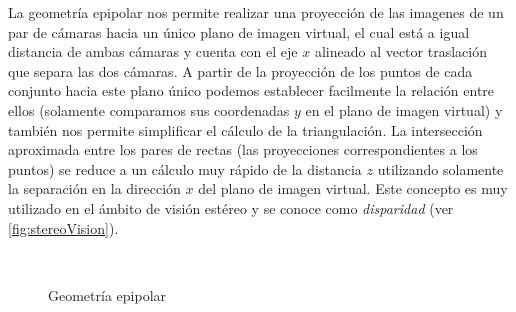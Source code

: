 La geometría epipolar nos permite realizar una proyección de las imagenes de un par de cámaras hacia un único plano de imagen virtual, el cual está a igual distancia de ambas cámaras y cuenta con el eje $x$ alineado al vector traslación que separa las dos cámaras. 
A partir de la proyección de los puntos de cada conjunto hacia este plano único podemos establecer facilmente la relación entre ellos (solamente comparamos sus coordenadas $y$ en el plano de imagen virtual) y también nos permite simplificar el cálculo de la triangulación. La intersección aproximada entre los pares de rectas (las proyecciones correspondientes a los puntos) se reduce a un cálculo muy rápido de la distancia $z$ utilizando solamente la separación en la dirección $x$ del plano de imagen virtual. Este concepto es muy utilizado en el ámbito de visión estéreo y se conoce como \emph{disparidad} (ver \autoref{fig:stereoVision}).

\begin{figure}[!bth]
    \myfloatalign
        \\
        \caption{Geometría epipolar}
        \label{fig:epipolarGeometry}
\end{figure}

